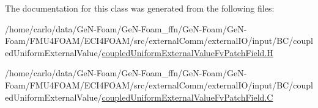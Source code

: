 The documentation for this class was generated from the following files\+:\begin{DoxyCompactItemize}
\item 
/home/carlo/data/\+Ge\+N-\/\+Foam/\+Ge\+N-\/\+Foam\+\_\+ffn/\+Ge\+N-\/\+Foam/\+Ge\+N-\/\+Foam/\+F\+M\+U4\+F\+O\+A\+M/\+E\+C\+I4\+F\+O\+A\+M/src/external\+Comm/external\+I\+O/input/\+B\+C/coupled\+Uniform\+External\+Value/\hyperlink{coupledUniformExternalValueFvPatchField_8H}{coupled\+Uniform\+External\+Value\+Fv\+Patch\+Field.\+H}\item 
/home/carlo/data/\+Ge\+N-\/\+Foam/\+Ge\+N-\/\+Foam\+\_\+ffn/\+Ge\+N-\/\+Foam/\+Ge\+N-\/\+Foam/\+F\+M\+U4\+F\+O\+A\+M/\+E\+C\+I4\+F\+O\+A\+M/src/external\+Comm/external\+I\+O/input/\+B\+C/coupled\+Uniform\+External\+Value/\hyperlink{coupledUniformExternalValueFvPatchField_8C}{coupled\+Uniform\+External\+Value\+Fv\+Patch\+Field.\+C}\end{DoxyCompactItemize}
